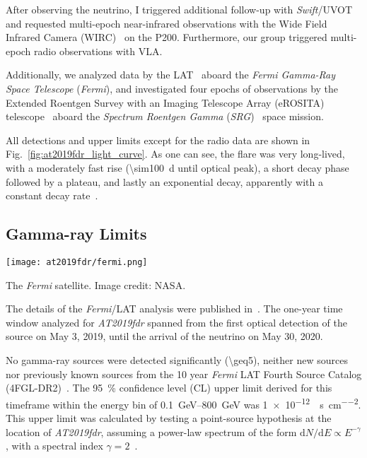 After observing the neutrino, I triggered additional follow-up with \textit{Swift}/UVOT and requested multi-epoch near-infrared observations with the Wide Field Infrared Camera (WIRC)~ on the P200. Furthermore, our group triggered multi-epoch radio observations with VLA.

Additionally, we analyzed data by the LAT~\cite{Atwood2009} aboard the \textit{Fermi Gamma-Ray Space Telescope} (\textit{Fermi}), and investigated four epochs of observations by the Extended Roentgen Survey with an Imaging Telescope Array (eROSITA) telescope~ aboard the \textit{Spectrum Roentgen Gamma} (\textit{SRG})~ space mission.

All detections and upper limits except for the radio data are shown in Fig.~\ref{fig:at2019fdr_light_curve}. As one can see, the flare was very long-lived, with a moderately fast rise (\SI{\sim100}{\day} until optical peak), a short decay phase followed by a plateau, and lastly an exponential decay, apparently with a constant decay rate~.

\subsection{Gamma-ray Limits}

\begin{marginfigure}
    \texttt{[image: at2019fdr/fermi.png]}
    \caption[The \textit{Fermi} satellite]{The \textit{Fermi} satellite. Image credit: NASA.}
\end{marginfigure}

The details of the \textit{Fermi}/LAT analysis were published in~. The one-year time window analyzed for \emph{AT2019fdr} spanned from the first optical detection of the source on May 3, 2019, until the arrival of the neutrino on May 30, 2020.

No gamma-ray sources were detected significantly (\SI{\geq5}{\sigma}), neither new sources nor previously known sources from the 10 year \textit{Fermi} LAT Fourth Source Catalog (4FGL-DR2)~. The \SI{95}{\percent} confidence level (CL) upper limit derived for this timeframe within the energy bin of \SIrange{0.1}{800}{\giga\eV} was \SI{1e-12}{\erg\per\s\per\square\cm}. This upper limit was calculated by testing a point-source hypothesis at the location of \emph{AT2019fdr}, assuming a power-law spectrum of the form $\text{d}N/\text{d}E \propto E^{-\gamma}$, with a spectral index $\gamma=2$~\cite{Velzen2021}.

